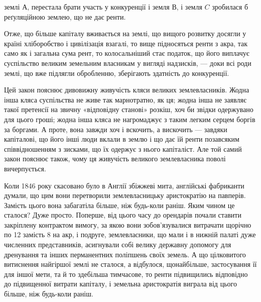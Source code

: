 \parcont{}  %
землі $А$, перестала брати участь у конкуренції і земля $В$, і земля $C$ зробилася б
реґуляційною землею, що не дає ренти.

Отже, що більше капіталу вживається на землі, що вищого розвитку досягли
у країні хліборобство і цивілізація взагалі, то вище підносяться ренти
з акра, так само як і загальна сума рент, то колосальніший стає податок, що
його виплачує суспільство великим земельним власникам у вигляді надзисків, — доки
всі роди землі, що вже підлягли обробленню, зберігають здатність до конкуренції.

Цей закон пояснює дивовижну живучість кляси великих землевласників.
Жодна інша кляса суспільства не живе так марнотратно, як ця; жодна інша
не заявляє такої претенсії на звичну «відповідну станові» розкіш, хоч би звідки
одержувано для цього гроші; жодна інша кляса не нагромаджує з таким легким
серцем боргів за боргами. А проте, вона завжди хоч і вскочить, а вискочить —
завдяки капіталові, що його інші люди вклали в землю і що дає їй ренти позавсяким
співвідношенням з зисками, що їх одержує з нього капіталіст. Але той самий закон
пояснює також, чому ця живучість великого землевласника поволі вичерпується.

Коли 1846 року скасовано було в Англії збіжжеві мита, англійські фабриканти
думали, що цим вони перетворили землевласницьку аристократію на
павперів. Замість цього вона забагатіла більше, ніж будь-коли раніш. Яким
чином це сталося? Дуже просто. Поперше, від цього часу до орендарів почали
ставити закріплену контрактом вимогу, за якою вони зобов’язувалися витрачати
щорічно по 12 замість 8 на акр, і подруге, землевласники, що мали і в
нижній палаті дуже численних представників, асигнували собі велику державну
допомогу для дренування та інших перманентних поліпшень своїх земель. А що
цілковитого витиснення найгіршої землі не сталося, а відбулося, щонайбільше,
застосування її для іншої мети, та й то здебільша тимчасове, то ренти підвищились
відповідно до підвищенної витрати капіталу, і земельна аристократія
виграла від цього більше, ніж будь-коли раніш.

